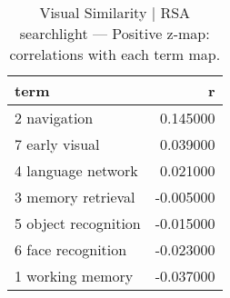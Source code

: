 \begin{table}
\caption{Visual Similarity | RSA searchlight — Positive z-map: correlations with each term map.}
\label{tab:Visual Similarity | RSA searchlight_pos}
\begin{tabular}{lr}
\toprule
term & r \\
\midrule
2 navigation & 0.145000 \\
7 early visual & 0.039000 \\
4 language network & 0.021000 \\
3 memory retrieval & -0.005000 \\
5 object recognition & -0.015000 \\
6 face recognition & -0.023000 \\
1 working memory & -0.037000 \\
\bottomrule
\end{tabular}
\end{table}

